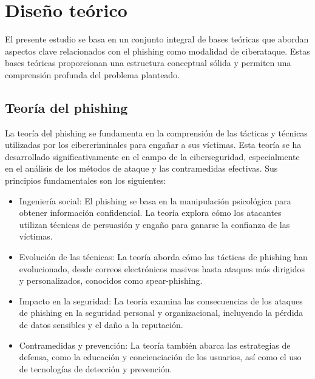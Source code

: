 \section{Diseño teórico}
El presente estudio se basa en un conjunto integral de bases teóricas que abordan aspectos clave relacionados con el phishing como modalidad de ciberataque. Estas bases teóricas proporcionan una estructura conceptual sólida y permiten una comprensión profunda del problema planteado.
\subsection{Teoría del phishing}
La teoría del phishing se fundamenta en la comprensión de las tácticas y técnicas utilizadas por los cibercriminales para engañar a sus víctimas. Esta teoría se ha desarrollado significativamente en el campo de la ciberseguridad, especialmente en el análisis de los métodos de ataque y las contramedidas efectivas. Sus principios fundamentales son los siguientes:
\begin{itemize}
    \item Ingeniería social: El phishing se basa en la manipulación psicológica para obtener información confidencial. La teoría explora cómo los atacantes utilizan técnicas de persuasión y engaño para ganarse la confianza de las víctimas.
    \item Evolución de las técnicas: La teoría aborda cómo las tácticas de phishing han evolucionado, desde correos electrónicos masivos hasta ataques más dirigidos y personalizados, conocidos como spear-phishing.
    \item Impacto en la seguridad: La teoría examina las consecuencias de los ataques de phishing en la seguridad personal y organizacional, incluyendo la pérdida de datos sensibles y el daño a la reputación.
    \item Contramedidas y prevención: La teoría también abarca las estrategias de defensa, como la educación y concienciación de los usuarios, así como el uso de tecnologías de detección y prevención.
\end{itemize}

